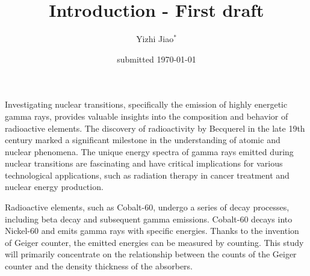 \documentclass[aps,twocolumn,showpacs,preprintnumbers]{revtex4}
\begin{document}
\title{Introduction - First draft}

\author{Yizhi Jiao$^\ast$}


\date{submitted \today}


\maketitle %


Investigating nuclear transitions, specifically the emission of highly energetic gamma rays, provides valuable insights into the composition and behavior of radioactive elements. 
The discovery of radioactivity by Becquerel in the late 19th century marked a significant milestone in the understanding of atomic and nuclear phenomena\cite{Becquerel}.
The unique energy spectra of gamma rays emitted during nuclear transitions are fascinating and have critical implications for various technological applications, such as radiation therapy in cancer treatment and nuclear energy production. 



Radioactive elements, such as Cobalt-60, undergo a series of decay processes, including beta decay and subsequent gamma emissions. 
Cobalt-60 decays into Nickel-60 and emits gamma rays with specific energies.
Thanks to the invention of Geiger counter\cite{Geiger}, the emitted energies can be measured by counting. 
This study will primarily concentrate on the relationship between the counts of the Geiger counter and the density thickness of the absorbers. 
\end{document}
